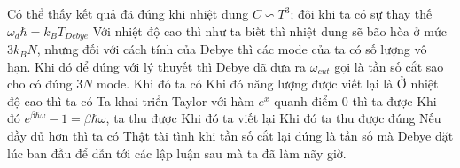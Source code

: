 Có thể thấy kết quả đã đúng khi nhiệt dung $C\backsim T^3$; đôi khi ta có sự thay thế $\omega_d\hbar=k_BT_{Debye}$
Với nhiệt độ cao thì như ta biết thì nhiệt dung sẽ bão hòa ở mức $3k_BN$, nhưng đối với cách tính của Debye thì các mode của ta có số lượng vô hạn. 
Khi đó để đúng với lý thuyết thì Debye đã đưa ra $\omega_{cut}$ gọi là tần số cắt sao cho có đúng $3N$ mode. Khi đó ta có
Khi đó năng lượng được viết lại là
Ở nhiệt độ cao thì ta có
Ta khai triển Taylor với hàm $e^x$ quanh điểm 0 thì ta được
Khi đó $e^{\beta\hbar\omega}-1 = \beta\hbar\omega$, ta thu được
Khi đó ta viết lại
Khi đó ta thu được đúng 
Nếu đầy đủ hơn thì ta có
Thật tài tình khi tần số cắt lại đúng là tần số mà Debye đặt lúc ban đầu để dẫn tới các lập luận sau mà ta đã làm nãy giờ.
